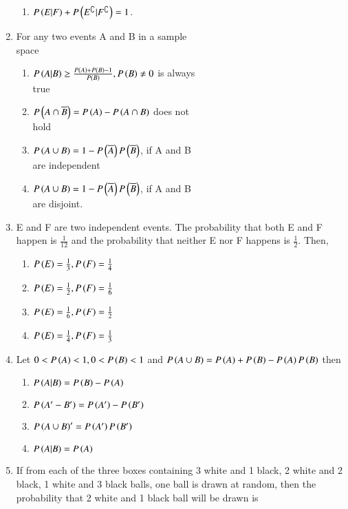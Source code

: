 \documentclass[journal,12pt,onecolumn,article]{IEEEtran}
\theoremstyle{remark}
\begin{document}
\begin{enumerate}[start=3]
\begin{enumerate}
\item $P\left(E|F\right)+P\left(E^\complement|F^\complement\right)=1$.
\end{enumerate}
\item For any two events A and B in a sample \\space
\hfill{}
\begin{enumerate}
\item $P\left(A|B\right)\geq \frac{P\left(A\right)+P\left(B\right)-1}{P\left(B\right)}, P\left(B\right)\neq 0$ is always\\ true
\item $P\left(A\cap \overline{B}\right)=P\left(A\right)-P\left(A\cap B\right)$ does not \\hold
\item $P\left(A\cup B\right)=1-P\left(\overline{A}\right)P\left(\overline{B}\right)$, if A and B \\are independent
\item $P\left(A\cup B\right)=1-P\left(\overline{A}\right)P\left(\overline{B}\right)$, if A and B \\are disjoint.
\end{enumerate}
\item E and F are two independent events. The probability that both E and F happen is $\frac{1}{12}$ and the probability that neither E nor F happens is $\frac{1}{2}$. Then,
\hfill{}
\begin{enumerate}
\item $P\left(E\right)=\frac{1}{3},P\left(F\right)=\frac{1}{4}$
\item $P\left(E\right)=\frac{1}{2},P\left(F\right)=\frac{1}{6}$
\item $P\left(E\right)=\frac{1}{6},P\left(F\right)=\frac{1}{2}$
\item $P\left(E\right)=\frac{1}{4},P\left(F\right)=\frac{1}{3}$
\end{enumerate}
\item Let $0<P\left(A\right)<1,0<P\left(B\right)<1$ and $P\left(A\cup B\right)=P\left(A\right)+P\left(B\right)-P\left(A\right)P\left(B\right)$ then
\hfill{}
\begin{enumerate}
\item $P\left(A|B\right)=P\left(B\right)-P\left(A\right)$
\item $P\left(A'-B'\right)=P\left(A'\right)-P\left(B'\right)$
\item $P\left(A\cup B\right)'=P\left(A'\right)P\left(B'\right)$
\item $P\left(A|B\right)=P\left(A\right)$
\end{enumerate}
\item If from each of the three boxes containing 3 white and 1 black, 2 white and 2 black, 1 white and 3 black balls, one ball is drawn at random, then the probability that 2 white and 1 black ball will be drawn is

\end{enumerate}
\end{document}
